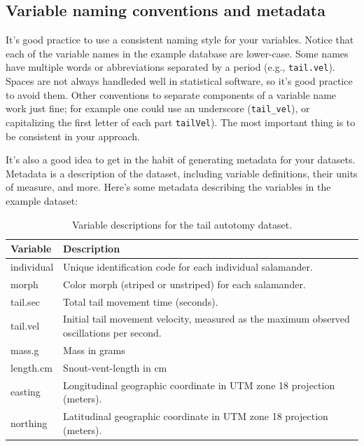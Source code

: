 \documentclass[
]{book}
\begin{document}
\subsection{Variable naming conventions and metadata}\label{variable-naming-conventions-and-metadata}

It's good practice to use a consistent naming style for your variables. Notice that each of the variable names in the example database are lower-case. Some names have multiple words or abbreviations separated by a period (e.g., \texttt{tail.vel}). Spaces are not always handleded well in statistical software, so it's good practice to avoid them. Other conventions to separate components of a variable name work just fine; for example one could use an underscore (\texttt{tail\_vel}), or capitalizing the first letter of each part \texttt{tailVel}). The most important thing is to be consistent in your approach.

It's also a good idea to get in the habit of generating metadata for your datasets. Metadata is a description of the dataset, including variable definitions, their units of measure, and more. Here's some metadata describing the variables in the example dataset:

\begin{table}[!h]
\centering
\caption{\label{tab:c03c03}\label{tab:c03c03} Variable descriptions for the tail autotomy dataset.}
\centering
\begin{tabular}[t]{ll}
\toprule
Variable & Description\\
\midrule
individual & Unique identification code for each individual salamander.\\
morph & Color morph (striped or unstriped) for each salamander.\\
tail.sec & Total tail movement time (seconds).\\
tail.vel & Initial tail movement velocity, measured as the maximum observed oscillations per second.\\
mass.g & Mass in grams\\
\addlinespace
length.cm & Snout-vent-length in cm\\
easting & Longitudinal geographic coordinate in UTM zone 18 projection (meters).\\
northing & Latitudinal geographic coordinate in UTM zone 18 projection (meters).\\
\bottomrule
\end{tabular}
\end{table}
\end{document}
